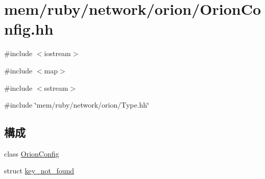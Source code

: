 \hypertarget{OrionConfig_8hh}{
\section{mem/ruby/network/orion/OrionConfig.hh}
\label{OrionConfig_8hh}
}
{\ttfamily \#include $<$iostream$>$}\par
{\ttfamily \#include $<$map$>$}\par
{\ttfamily \#include $<$sstream$>$}\par
{\ttfamily \#include \char`\"{}mem/ruby/network/orion/Type.hh\char`\"{}}\par
\subsection*{構成}
\begin{DoxyCompactItemize}
\item 
class \hyperlink{classOrionConfig}{OrionConfig}
\item 
struct \hyperlink{structOrionConfig_1_1key__not__found}{key\_\-not\_\-found}
\end{DoxyCompactItemize}
